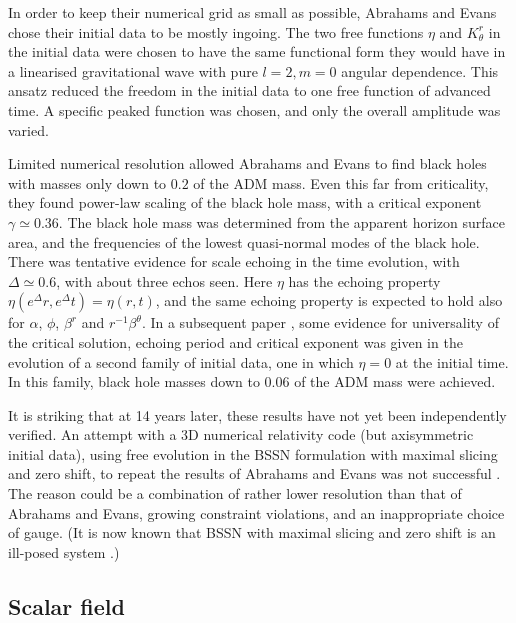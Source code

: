 \documentclass{article}
\begin{document}
In order to keep their numerical grid as small as possible, Abrahams
and Evans chose their initial data to be mostly ingoing. The two free
functions $\eta$ and $K^r_\theta$ in the initial data were chosen to
have the same functional form they would have in a linearised
gravitational wave with pure $l=2,m=0$ angular dependence. This ansatz
reduced the freedom in the initial data to one free function of
advanced time. A specific peaked function was chosen, and only the
overall amplitude was varied.

Limited numerical resolution allowed Abrahams and Evans to find black
holes with masses only down to $0.2$ of the ADM mass. Even this far
from criticality, they found power-law scaling of the black hole mass,
with a critical exponent $\gamma\simeq 0.36$. The black hole mass was
determined from the apparent horizon surface area, and the frequencies
of the lowest quasi-normal modes of the black hole.  There was
tentative evidence for scale echoing in the time evolution, with
$\Delta\simeq 0.6$, with about three echos seen. Here $\eta$ has the
echoing property $\eta(e^\Delta r,e^\Delta t)=\eta(r,t)$, and the same
echoing property is expected to hold also for $\alpha$, $\phi$,
$\beta^r$ and $r^{-1}\beta^\theta$. In a subsequent paper
\cite{AbrahamsEvans2}, some evidence for universality of the critical
solution, echoing period and critical exponent was given in the
evolution of a second family of initial data, one in which $\eta=0$ at
the initial time. In this family, black hole masses down to $0.06$ of
the ADM mass were achieved.

It is striking that at 14 years later, these results have not yet been
independently verified. An attempt with a 3D numerical relativity code
(but axisymmetric initial data), using free evolution in the BSSN
formulation with maximal slicing and zero shift, to repeat the results
of Abrahams and Evans was not successful \cite{Alcubierre_Brill}. The
reason could be a combination of rather lower resolution than that of
Abrahams and Evans, growing constraint violations, and an
inappropriate choice of gauge. (It is now known that BSSN with maximal
slicing and zero shift is an ill-posed system \cite{bssn3}.)


\subsection{Scalar field}
\end{document}
